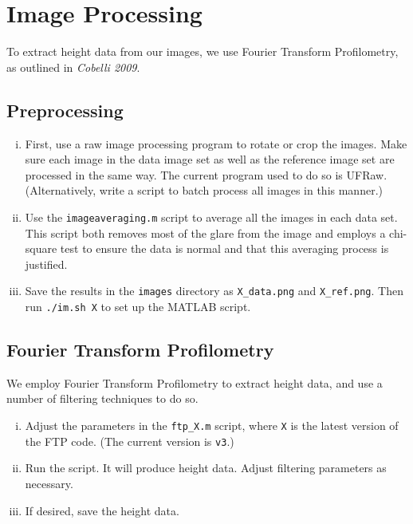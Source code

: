 \documentclass[11pt]{article}
\begin{document}
\section*{Image Processing}

To extract height data from our images, we use Fourier Transform Profilometry, as outlined in {\it Cobelli 2009}.

\subsection*{Preprocessing}

\begin{enumerate}[(i)]
    \item First, use a raw image processing program to rotate or crop the images. Make sure each image in the data image set as well as the reference image set are processed in the same way. The current program used to do so is UFRaw. (Alternatively, write a script to batch process all images in this manner.)

    \item Use the {\tt imageaveraging.m} script to average all the images in each data set. This script both removes most of the glare from the image and employs a chi-square test to ensure the data is normal and that this averaging process is justified.

    \item Save the results in the {\tt images} directory as {\tt X\_data.png} and {\tt X\_ref.png}. Then run {\tt ./im.sh X} to set up the MATLAB script.
\end{enumerate}

\subsection*{Fourier Transform Profilometry}

We employ Fourier Transform Profilometry to extract height data, and use a number of filtering techniques to do so.

\begin{enumerate}[(i)]
    \item Adjust the parameters in the {\tt ftp\_X.m} script, where {\tt X} is the latest version of the FTP code. (The current version is {\tt v3}.)

    \item Run the script. It will produce height data. Adjust filtering parameters as necessary.

    \item If desired, save the height data.
\end{enumerate}
\end{document}

